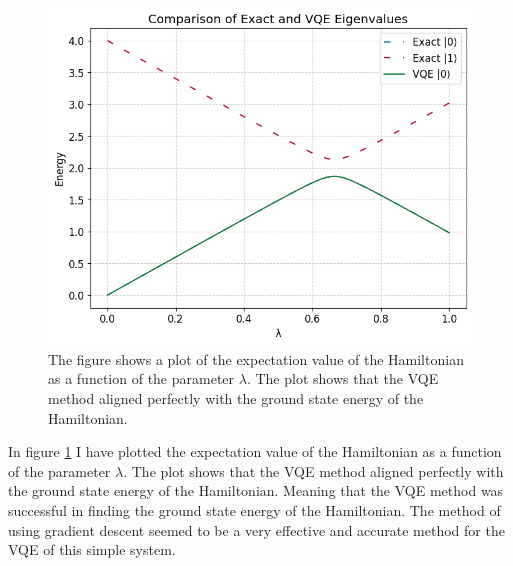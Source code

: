 \documentclass[11pt, letterpaper, titlepage]{article}
\begin{document}
\begin{figure}
        \begin{center}
                \includegraphics[scale=0.6]{VQE.png}
        \end{center}
        \caption{The figure shows a plot of the expectation value of the Hamiltonian as a function of the parameter \(λ\). The plot shows that the VQE method aligned perfectly with the ground state energy of the Hamiltonian.}
        \label{fig:VQE}
\end{figure}\newpage
In figure \ref{fig:VQE} I have plotted the expectation value of the Hamiltonian as a function of the parameter \(λ\). The plot shows that the VQE method aligned perfectly with the ground state energy of the Hamiltonian. Meaning that the VQE method was successful in finding the ground state energy of the Hamiltonian. The method of using gradient descent seemed to be a very effective and accurate method for the VQE of this simple system. \newline
\end{document}
